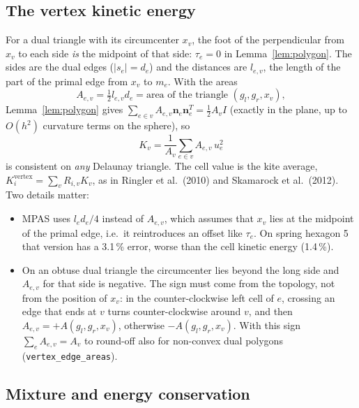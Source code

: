 \documentclass[11pt,a4paper]{article}
\newcommand{\bn}{\mathbf{n}}
\newcommand{\code}[1]{\texttt{#1}}
\begin{document}
\subsection{The vertex kinetic energy}

For a dual triangle with its circumcenter $x_v$, the foot of the perpendicular from
$x_v$ to each side \emph{is} the midpoint of that side: $\tau_e = 0$ in
Lemma~\ref{lem:polygon}. The sides are the dual edges ($|s_e| = d_e$) and the
distances are $l_{e,v}$, the length of the part of the primal edge from $x_v$ to
$m_e$. With the areas
\begin{equation}
  A_{e,v} = \tfrac12 l_{e,v}d_e = \text{area of the triangle } (g_l, g_r, x_v),
\end{equation}
Lemma~\ref{lem:polygon} gives $\sum_{e\in v}A_{e,v}\bn_e\bn_e^T = \tfrac12A_vI$
(exactly in the plane, up to $O(h^2)$ curvature terms on the sphere), so
\begin{equation}
  K_v = \frac1{A_v}\sum_{e\in v}A_{e,v}\,u_e^2
  \label{eq:Kv}
\end{equation}
is consistent on \emph{any} Delaunay triangle. The cell value is the kite average,
$K_i^{\mathrm{vertex}} = \sum_v R_{i,v}K_v$, as in Ringler et al.\ (2010) and
Skamarock et al.\ (2012). Two details matter:
\begin{itemize}
\item MPAS uses $l_ed_e/4$ instead of $A_{e,v}$, which assumes that $x_v$ lies at
  the midpoint of the primal edge, i.e.\ it reintroduces an offset like $\tau_e$. On
  spring hexagon 5 that version has a 3.1\,\% error, worse than the cell kinetic energy
  (1.4\,\%).
\item On an obtuse dual triangle the circumcenter lies beyond the long side and
  $A_{e,v}$ for that side is negative. The sign must come from the topology, not
  from the position of $x_v$: in the counter-clockwise left cell of $e$, crossing an
  edge that ends at $v$ turns counter-clockwise around $v$, and then
  $A_{e,v} = +A(g_l,g_r,x_v)$, otherwise $-A(g_l,g_r,x_v)$. With this sign
  $\sum_eA_{e,v} = A_v$ to round-off also for non-convex dual polygons
  (\code{vertex\_edge\_areas}).
\end{itemize}

\subsection{Mixture and energy conservation}
\end{document}
